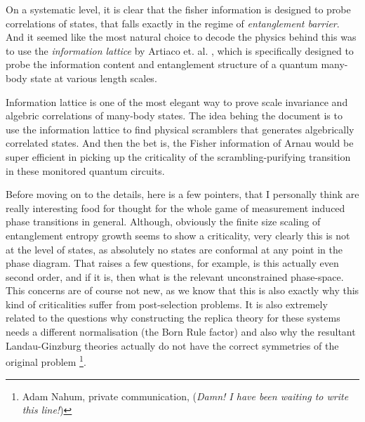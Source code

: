 On a systematic level, it is clear that the fisher information is designed to probe correlations of states, that falls exactly in the regime of \textit{entanglement barrier}. And it seemed like the most natural choice to decode the physics behind this was to use the \textit{information lattice} by Artiaco et. al. \cite{Artiaco2024EfficientLargePRXQuantum}, which is specifically designed to probe the information content and entanglement structure of a quantum many-body state at various length scales. 


Information lattice is one of the most elegant way to prove scale invariance and algebric correlations of many-body states. The idea behing the document is to use the information lattice to find physical scramblers that generates algebrically correlated states. And then the bet is, the Fisher information of Arnau would be super efficient in picking up the criticality of the scrambling-purifying transition in these monitored quantum circuits.

Before moving on to the details, here is a few pointers, that I personally think are really interesting food for thought for the whole game of measurement induced phase transitions in general. Although, obviously the finite size scaling of entanglement entropy growth seems to show a criticality, very clearly this is not at the level of states, as absolutely no states are conformal at any point in the phase diagram. That raises a few questions, for example, is this actually even second order, and if it is, then what is the relevant unconstrained phase-space. This concerns are of course not new, as we know that this is also exactly why this kind of criticalities suffer from post-selection problems. It is also extremely related to the questions why constructing the replica theory for these systems needs a different normalisation (the Born Rule factor) and also why the resultant Landau-Ginzburg theories \cite{Adam2021MeasurementEntanglementPRXQuantumTheTheoryOfEverythingPaper} actually do not have the correct symmetries of the original problem \footnote{ Adam Nahum, private communication, (\textit{Damn! I have been waiting to write this line!})}.